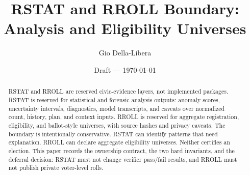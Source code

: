 \documentclass[12pt]{article}
\title{RSTAT and RROLL Boundary: Analysis and Eligibility Universes}
\author{Gio Della-Libera}
\date{Draft --- \today}
\begin{document}
\maketitle

\begin{abstract}
RSTAT and RROLL are reserved civic-evidence layers, not implemented packages.
RSTAT is reserved for statistical and forensic analysis outputs: anomaly
scores, uncertainty intervals, diagnostics, model transcripts, and caveats over
normalized count, history, plan, and context inputs. RROLL is reserved for
aggregate registration, eligibility, and ballot-style universes, with source
hashes and privacy caveats. The boundary is intentionally conservative. RSTAT
can identify patterns that need explanation. RROLL can declare aggregate
eligibility universes. Neither certifies an election. This paper records the
ownership contract, the two hard invariants, and the deferral decision: RSTAT
must not change verifier pass/fail results, and RROLL must not publish private
voter-level rolls.
\end{abstract}






\nocite{rcount-overview-2026,civic-evidence-boundaries-2026}


\end{document}
